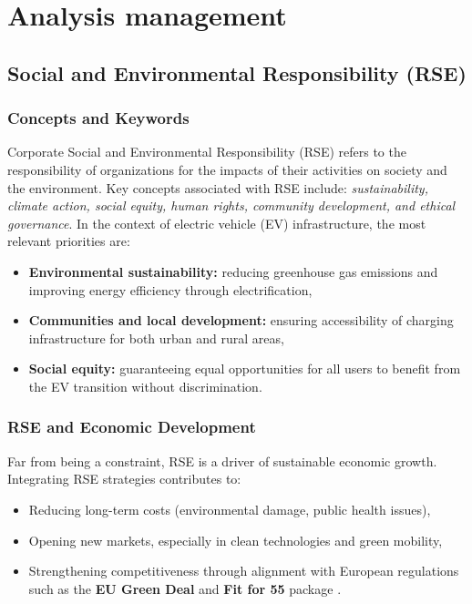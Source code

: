 \chapter{Analysis management}\label{chap6}

\section{Social and Environmental Responsibility (RSE)}

\subsection*{Concepts and Keywords}
Corporate Social and Environmental Responsibility (RSE) refers to the responsibility of organizations for the impacts of their activities on society and the environment.  
Key concepts associated with RSE include: \textit{sustainability, climate action, social equity, human rights, community development, and ethical governance}.  
In the context of electric vehicle (EV) infrastructure, the most relevant priorities are:
\begin{itemize}
    \item \textbf{Environmental sustainability:} reducing greenhouse gas emissions and improving energy efficiency through electrification,
    \item \textbf{Communities and local development:} ensuring accessibility of charging infrastructure for both urban and rural areas,
    \item \textbf{Social equity:} guaranteeing equal opportunities for all users to benefit from the EV transition without discrimination.
\end{itemize}

\subsection*{RSE and Economic Development}
Far from being a constraint, RSE is a driver of sustainable economic growth. Integrating RSE strategies contributes to:
\begin{itemize}
    \item Reducing long-term costs (environmental damage, public health issues),
    \item Opening new markets, especially in clean technologies and green mobility,
    \item Strengthening competitiveness through alignment with European regulations such as the \textbf{EU Green Deal} and \textbf{Fit for 55} package \cite{europeancommission2021greendeal}.
\end{itemize}

